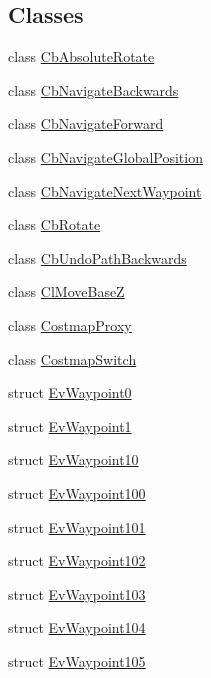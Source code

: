 \subsection*{Classes}
\begin{DoxyCompactItemize}
\item 
class \hyperlink{classcl__move__base__z_1_1CbAbsoluteRotate}{Cb\+Absolute\+Rotate}
\item 
class \hyperlink{classcl__move__base__z_1_1CbNavigateBackwards}{Cb\+Navigate\+Backwards}
\item 
class \hyperlink{classcl__move__base__z_1_1CbNavigateForward}{Cb\+Navigate\+Forward}
\item 
class \hyperlink{classcl__move__base__z_1_1CbNavigateGlobalPosition}{Cb\+Navigate\+Global\+Position}
\item 
class \hyperlink{classcl__move__base__z_1_1CbNavigateNextWaypoint}{Cb\+Navigate\+Next\+Waypoint}
\item 
class \hyperlink{classcl__move__base__z_1_1CbRotate}{Cb\+Rotate}
\item 
class \hyperlink{classcl__move__base__z_1_1CbUndoPathBackwards}{Cb\+Undo\+Path\+Backwards}
\item 
class \hyperlink{classcl__move__base__z_1_1ClMoveBaseZ}{Cl\+Move\+BaseZ}
\item 
class \hyperlink{classcl__move__base__z_1_1CostmapProxy}{Costmap\+Proxy}
\item 
class \hyperlink{classcl__move__base__z_1_1CostmapSwitch}{Costmap\+Switch}
\item 
struct \hyperlink{structcl__move__base__z_1_1EvWaypoint0}{Ev\+Waypoint0}
\item 
struct \hyperlink{structcl__move__base__z_1_1EvWaypoint1}{Ev\+Waypoint1}
\item 
struct \hyperlink{structcl__move__base__z_1_1EvWaypoint10}{Ev\+Waypoint10}
\item 
struct \hyperlink{structcl__move__base__z_1_1EvWaypoint100}{Ev\+Waypoint100}
\item 
struct \hyperlink{structcl__move__base__z_1_1EvWaypoint101}{Ev\+Waypoint101}
\item 
struct \hyperlink{structcl__move__base__z_1_1EvWaypoint102}{Ev\+Waypoint102}
\item 
struct \hyperlink{structcl__move__base__z_1_1EvWaypoint103}{Ev\+Waypoint103}
\item 
struct \hyperlink{structcl__move__base__z_1_1EvWaypoint104}{Ev\+Waypoint104}
\item 
struct \hyperlink{structcl__move__base__z_1_1EvWaypoint105}{Ev\+Waypoint105}

\end{DoxyCompactItemize}
